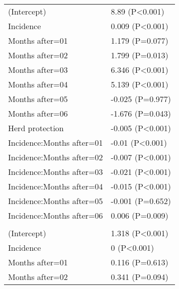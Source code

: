 \documentclass[]{article}
\begin{document}
\begin{longtable}[t]{ll}
\hspace{1em}(Intercept) & 8.89 (P<0.001)\\
\hspace{1em}Incidence & 0.009 (P<0.001)\\
\hspace{1em}Months after=01 & 1.179 (P=0.077)\\
\hspace{1em}Months after=02 & 1.799 (P=0.013)\\
\hspace{1em}Months after=03 & 6.346 (P<0.001)\\
\hspace{1em}Months after=04 & 5.139 (P<0.001)\\
\hspace{1em}Months after=05 & -0.025 (P=0.977)\\
\hspace{1em}Months after=06 & -1.676 (P=0.043)\\
\hspace{1em}Herd protection & -0.005 (P<0.001)\\
\hspace{1em}Incidence:Months after=01 & -0.01 (P<0.001)\\
\hspace{1em}Incidence:Months after=02 & -0.007 (P<0.001)\\
\hspace{1em}Incidence:Months after=03 &\vphantom{1} -0.021 (P<0.001)\\
\hspace{1em}Incidence:Months after=04 & -0.015 (P<0.001)\\
\hspace{1em}Incidence:Months after=05 & -0.001 (P=0.652)\\
\hspace{1em}Incidence:Months after=06 & 0.006 (P=0.009)\\
\addlinespace[1.5em]
\multicolumn{2}{l}{\textbf{Temporary field worker}}\\
\hspace{1em}(Intercept) & 1.318 (P<0.001)\\
\hspace{1em}Incidence & 0 (P<0.001)\\
\hspace{1em}Months after=01 & 0.116 (P=0.613)\\
\hspace{1em}Months after=02 & 0.341 (P=0.094)\\

\end{longtable}
\end{document}

